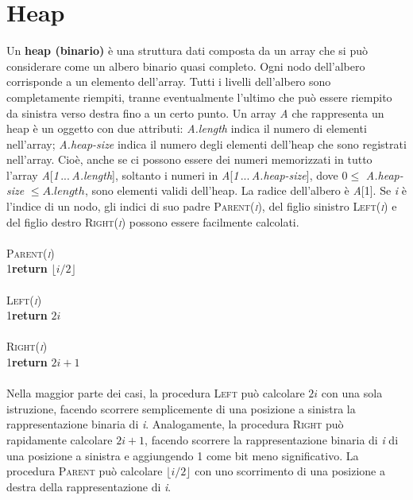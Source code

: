 \documentclass[10pt, a4paper]{report}
\newcommand\firsttab[1][0.5cm]{\hspace*{#1}}
\begin{document}
\chapter{Heap}
Un \textbf{heap (binario)} è una struttura dati composta da un array che si può considerare come un albero binario quasi completo. Ogni nodo dell'albero corrisponde a un elemento dell'array. Tutti i livelli dell'albero sono completamente riempiti, tranne eventualmente l'ultimo che può essere riempito da sinistra verso destra fino a un certo punto. Un array \textit{A} che rappresenta un heap è un oggetto con due attributi: \textit{A.length} indica il numero di elementi nell'array; \textit{A.heap-size} indica il numero degli elementi dell'heap che sono registrati nell'array. Cioè, anche se ci possono essere dei numeri memorizzati in tutto l'array \textit{A}[\textit{1}\,...\,\textit{A.length}], soltanto i numeri in \textit{A}[\textit{1}\,...\,\textit{A.heap-size}], dove $0 \leq$ \textit{A.heap-size} $\leq A.length$, sono elementi validi dell'heap. La radice dell'albero è \textit{A}[1]. Se \textit{i} è l'indice di un nodo, gli indici di suo padre \textsc{Parent(\textit{i})}, del figlio sinistro \textsc{Left(\textit{i})} e del figlio destro \textsc{Right(\textit{i})} possono essere facilmente calcolati.\\\\
\textsc{Parent(\textit{i})}\\
1\firsttab\textbf{return} $\lfloor i/2 \rfloor$\\\\
\textsc{Left(\textit{i})}\\
1\firsttab\textbf{return} $2i$\\\\
\textsc{Right(\textit{i})}\\
1\firsttab\textbf{return} $2i + 1$\\\\
Nella maggior parte dei casi, la procedura \textsc{Left} può calcolare $2i$ con una sola istruzione, facendo scorrere semplicemente di una posizione a sinistra la rappresentazione binaria di \textit{i}. Analogamente, la procedura \textsc{Right} può rapidamente calcolare $2i + 1$, facendo scorrere la rappresentazione binaria di \textit{i} di una posizione a sinistra e aggiungendo 1 come bit meno significativo. La procedura \textsc{Parent} può calcolare $\lfloor i/2 \rfloor$ con uno scorrimento di una posizione a destra della rappresentazione di \textit{i}.
\end{document}
